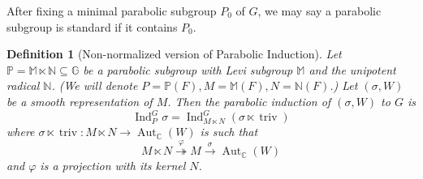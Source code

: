 \documentclass[8pt]{article}
\newtheorem{definition}{Definition}[section]
\DeclareMathOperator{\triv}{triv}
\DeclareMathOperator{\Aut}{Aut}
\DeclareMathOperator{\Ind}{Ind}
\newcommand{\N}[0]{\mathbb{N}}
\newcommand{\C}[0]{\mathbb{C}}
\newcommand{\G}[0]{\mathbb{G}}
\newcommand{\Para}[0]{\mathbb{P}}
\newcommand{\M}[0]{\mathbb{M}}
\begin{document}
After fixing a minimal parabolic subgroup $P_0$ of $G$, we may say a parabolic subgroup is standard if it contains $P_0$.

\begin{definition}[Non-normalized version of Parabolic Induction]
Let $\Para=\M\ltimes\N\subseteq\G$ be a parabolic subgroup with Levi subgroup $\M$ and the unipotent radical $\N$. (We will denote $P = \Para(F),M=\M(F),N=\N(F)$.) Let $(\sigma, W)$ be a smooth representation of $M$. Then the parabolic induction of $(\sigma,W)$ to $G$ is 
\begin{equation*}
\Ind_P^G\sigma = \Ind_{M\ltimes N}^G(\sigma\ltimes\triv)
\end{equation*}
where $\sigma\ltimes\triv:M\ltimes N\to\Aut_\C(W)$ is such that
\begin{equation*}
M\ltimes N\stackrel{\varphi}{\twoheadrightarrow} M\stackrel{\sigma}{\to}\Aut_\C(W)
\end{equation*}
and $\varphi$ is a projection with its kernel $N$.
\end{definition}
\end{document}
